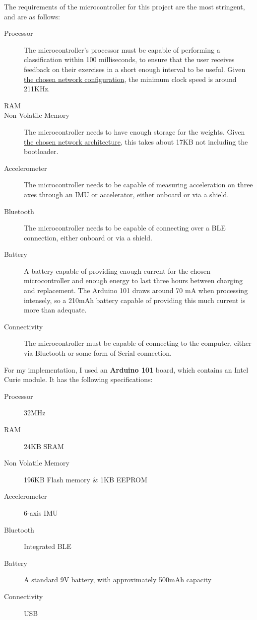 \documentclass[a4paper]{article}
\begin{document}
The requirements of the microcontroller for this project are the most stringent, and are as follows:

\begin{description}
\item[Processor] The microcontroller's processor must be capable of performing a classification within 100 milliseconds, to ensure that the user receives feedback on their exercises in a short enough interval to be useful. Given \hyperref[subsec:dc_networkarchitecture]{the chosen network configuration}, the minimum clock speed is around 211KHz.\cite{dsref0}
\item[RAM] 
\item[Non Volatile Memory] The microcontroller needs to have enough storage for the weights. Given \hyperref[subsec:dc_networkarchitecture]{the chosen network architecture}, this takes about 17KB not including the bootloader\cite{dsref2}.
\item[Accelerometer] The microcontroller needs to be capable of measuring acceleration on three axes through an IMU or accelerator, either onboard or via a shield.
\item[Bluetooth] The microcontroller needs to be capable of connecting over a BLE connection, either onboard or via a shield.
\item[Battery] A battery capable of providing enough current for the chosen microcontroller and enough energy to last three hours between charging and replacement. The Arduino 101 draws around 70 mA when processing intensely,\cite{dsref3} so a 210mAh battery capable of providing this much current is more than adequate.
\item[Connectivity] The microcontroller must be capable of connecting to the computer, either via Bluetooth or some form of Serial connection.
\end{description}

For my implementation, I used an \textbf{Arduino 101} board, which contains an Intel Curie module. It has the following specifications:\cite{dsref4}

\begin{description}
\item[Processor] 32MHz
\item[RAM] 24KB SRAM
\item[Non Volatile Memory] 196KB Flash memory \& 1KB EEPROM
\item[Accelerometer] 6-axis IMU
\item[Bluetooth] Integrated BLE 
\item[Battery] A standard 9V battery, with approximately 500mAh capacity\cite{dsref5}
\item[Connectivity] USB
\end{description}
\end{document}
